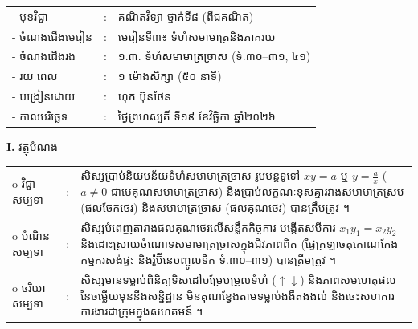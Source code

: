 \documentclass[a4paper,10pt]{article}
\newcommand{\wcirc}{{\CourierBullet\fontsize{9.5pt}{11pt}\selectfont o}}
\begin{document}
{\renewcommand{\arraystretch}{0.98}
\hspace*{3.1cm}%
\begin{tabular}{@{}l l L{11.0cm}@{}}
  - \hspace{0.35cm} មុខវិជ្ជា & : & គណិតវិទ្យា ថ្នាក់ទី៨ (ពីជគណិត) \\
  - \hspace{0.35cm} ចំណងជើងមេរៀន & : & មេរៀនទី៣៖ ទំហំសមាមាត្រនិងភាគរយ \\
  - \hspace{0.35cm} ចំណងជើងរង & : & ១.៣. ទំហំសមាមាត្រច្រាស (ទំ.៣០–៣១, ៤១) \\
  - \hspace{0.35cm} រយៈពេល & : & ១ ម៉ោងសិក្សា (៥០ នាទី) \\
  - \hspace{0.35cm} បង្រៀនដោយ & : & ហុក ប៊ុនថែន \\
  - \hspace{0.35cm} កាលបរិច្ឆេទ & : & ថ្ងៃព្រហស្បតិ៍ ទី១៩ ខែវិច្ឆិកា ឆ្នាំ២០២៦ \\
\end{tabular}

\vspace{2pt}

\textbf{I.} {\muol វត្ថុបំណង}\\[1pt]
\hspace*{0.55cm}%
\begin{tabular}{@{}l l L{14.2cm}@{}}
  \wcirc \hspace{0.25cm} វិជ្ជាសម្បទា & : & សិស្សប្រាប់និយមន័យទំហំសមាមាត្រច្រាស រូបមន្តទូទៅ $xy = a$ ឬ $y = \frac{a}{x}$ ($a \neq 0$ ជាមេគុណសមាមាត្រច្រាស) និងប្រាប់លក្ខណៈខុសគ្នារវាងសមាមាត្រស្រប (ផលចែកថេរ) និងសមាមាត្រច្រាស (ផលគុណថេរ) បានត្រឹមត្រូវ ។ \\
  \wcirc \hspace{0.25cm} បំណិនសម្បទា & : & សិស្សបំពេញតារាងផលគុណថេរលើសន្លឹកកិច្ចការ បង្កើតសមីការ $x_1 y_1 = x_2 y_2$ និងដោះស្រាយចំណោទសមាមាត្រច្រាសក្នុងជីវភាពពិត (ផ្ទៃក្រឡាចតុកោណកែង កម្មករសង់ផ្ទះ និងរ៉ូប៊ីនេបញ្ចូលទឹក ទំ.៣០–៣១) បានត្រឹមត្រូវ ។ \\
  \wcirc \hspace{0.25cm} ចរិយាសម្បទា & : & សិស្សមានទម្លាប់ពិនិត្យទិសដៅបម្រែបម្រួលទំហំ ($\uparrow\downarrow$) និងភាពសមហេតុផលនៃចម្លើយមុននឹងសន្និដ្ឋាន មិនគុណខ្វែងតាមទម្លាប់ងងឹតងងល់ និងចេះសហការការងារជាក្រុមក្នុងសហគមន៍ ។ \\
\end{tabular}

}
\end{document}
